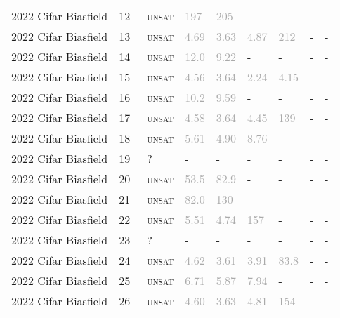 \begin{center}
{\begin{longtable}{@{}lllllllll@{}}
2022 Cifar Biasfield & 12 & ~\textsc{unsat} & \textcolor{darkgray}{197} & \textcolor{darkgray}{205} & - & - & - & - \\
2022 Cifar Biasfield & 13 & ~\textsc{unsat} & \textcolor{darkgray}{4.69} & \textcolor{darkgray}{3.63} & \textcolor{darkgray}{4.87} & \textcolor{darkgray}{212} & - & - \\
2022 Cifar Biasfield & 14 & ~\textsc{unsat} & \textcolor{darkgray}{12.0} & \textcolor{darkgray}{9.22} & - & - & - & - \\
2022 Cifar Biasfield & 15 & ~\textsc{unsat} & \textcolor{darkgray}{4.56} & \textcolor{darkgray}{3.64} & \textcolor{darkgray}{2.24} & \textcolor{darkgray}{4.15} & - & - \\
2022 Cifar Biasfield & 16 & ~\textsc{unsat} & \textcolor{darkgray}{10.2} & \textcolor{darkgray}{9.59} & - & - & - & - \\
2022 Cifar Biasfield & 17 & ~\textsc{unsat} & \textcolor{darkgray}{4.58} & \textcolor{darkgray}{3.64} & \textcolor{darkgray}{4.45} & \textcolor{darkgray}{139} & - & - \\
2022 Cifar Biasfield & 18 & ~\textsc{unsat} & \textcolor{darkgray}{5.61} & \textcolor{darkgray}{4.90} & \textcolor{darkgray}{8.76} & - & - & - \\
2022 Cifar Biasfield & 19 & ~? & - & - & - & - & - & - \\
2022 Cifar Biasfield & 20 & ~\textsc{unsat} & \textcolor{darkgray}{53.5} & \textcolor{darkgray}{82.9} & - & - & - & - \\
2022 Cifar Biasfield & 21 & ~\textsc{unsat} & \textcolor{darkgray}{82.0} & \textcolor{darkgray}{130} & - & - & - & - \\
2022 Cifar Biasfield & 22 & ~\textsc{unsat} & \textcolor{darkgray}{5.51} & \textcolor{darkgray}{4.74} & \textcolor{darkgray}{157} & - & - & - \\
2022 Cifar Biasfield & 23 & ~? & - & - & - & - & - & - \\
2022 Cifar Biasfield & 24 & ~\textsc{unsat} & \textcolor{darkgray}{4.62} & \textcolor{darkgray}{3.61} & \textcolor{darkgray}{3.91} & \textcolor{darkgray}{83.8} & - & - \\
2022 Cifar Biasfield & 25 & ~\textsc{unsat} & \textcolor{darkgray}{6.71} & \textcolor{darkgray}{5.87} & \textcolor{darkgray}{7.94} & - & - & - \\
2022 Cifar Biasfield & 26 & ~\textsc{unsat} & \textcolor{darkgray}{4.60} & \textcolor{darkgray}{3.63} & \textcolor{darkgray}{4.81} & \textcolor{darkgray}{154} & - & - \\

\end{longtable}}
\end{center}
